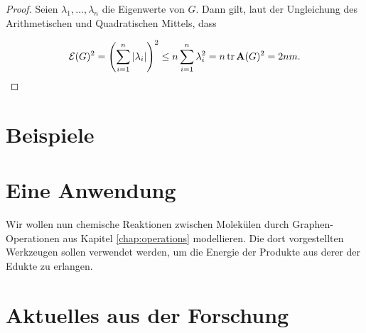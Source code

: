        \begin{proof}

            Seien $\lambda_1, \dots, \lambda_n$ die Eigenwerte von $G$.
            Dann gilt, laut der Ungleichung des Arithmetischen und Quadratischen Mittels, dass

            \begin{align*}
                \mathcal E(G)^2
                =
                {\left ( 
                    \sum_{i=1}^n
                        |\lambda_i|
                 \right )}^2
                \leq
                n \sum_{i=1}^n \lambda_i^2
                =
                n \operatorname{tr} \mathbf A(G)^2
                =
                2 n m.
            \end{align*}

        \end{proof}


    \section{Beispiele}

    \section{Eine Anwendung}

        Wir wollen nun chemische Reaktionen zwischen Molekülen durch Graphen-Operationen aus Kapitel \ref{chap:operations} modellieren.
        Die dort vorgestellten Werkzeugen sollen verwendet werden, um die Energie der Produkte aus derer der Edukte zu erlangen.

        \section{Aktuelles aus der Forschung}

